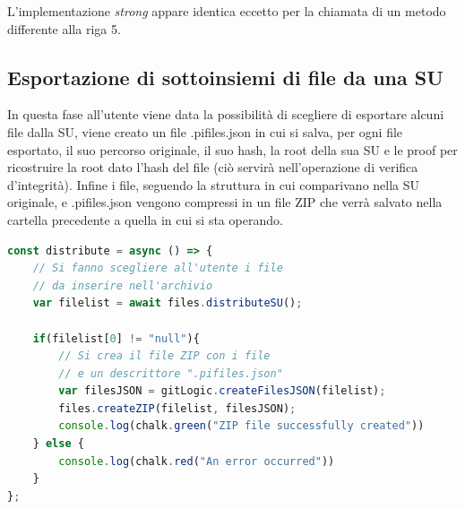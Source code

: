 L'implementazione \emph{strong} appare identica eccetto per la chiamata di un metodo differente
alla \textsf{riga 5}. 

\subsection{Esportazione di sottoinsiemi di file da una SU}
In questa fase all'utente viene data la possibilità di scegliere di esportare alcuni file dalla SU, viene creato un file \textsf{.pifiles.json} in cui si salva, per ogni file esportato, il suo percorso originale, il suo hash, la root della sua SU e le proof per ricostruire la root dato l'hash del file (ciò servirà nell'operazione di verifica d'integrità). Infine i file, seguendo la struttura in cui comparivano nella SU originale, e \textsf{.pifiles.json} vengono compressi in un file ZIP che verrà salvato nella cartella precedente a quella in cui si sta operando.
\\
\begin{lstlisting}[language=JavaScript]
const distribute = async () => {
    // Si fanno scegliere all'utente i file
    // da inserire nell'archivio
    var filelist = await files.distributeSU();
    
    if(filelist[0] != "null"){
        // Si crea il file ZIP con i file
        // e un descrittore ".pifiles.json"
        var filesJSON = gitLogic.createFilesJSON(filelist);
        files.createZIP(filelist, filesJSON);
        console.log(chalk.green("ZIP file successfully created"))
    } else {
        console.log(chalk.red("An error occurred"))
    }
};
\end{lstlisting}

